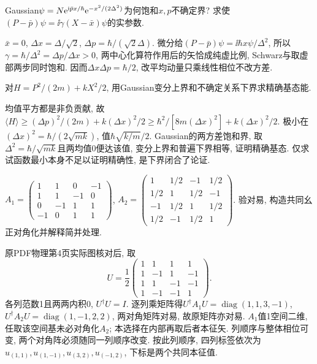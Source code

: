 \begin{exercise}
Gaussian$\psi=N\mathrm e^{\mathrm i\bar p x/\hbar}\mathrm e^{-x^2/(2\Delta^2)}$为何饱和$x,p$不确定界? 求使$(P-\bar p)\psi=\ii\gamma(X-\bar x)\psi$的实参数.
\end{exercise}
\begin{solution}
$\bar x=0$, $\Delta x=\Delta/\sqrt2$, $\Delta p=\hbar/(\sqrt2\Delta)$. 微分给$(P-\bar p)\psi=\ii\hbar x\psi/\Delta^2$, 所以$\gamma=\hbar/\Delta^2=\Delta p/\Delta x>0$, 两中心化算符作用后的矢恰成纯虚比例, Schwarz与取虚部两步同时饱和. 因而$\Delta x\Delta p=\hbar/2$, 改平均动量只乘线性相位不改方差.
\end{solution}
\begin{exercise}
对$H=P^2/(2m)+kX^2/2$, 用Gaussian变分上界和不确定关系下界求精确基态能.
\end{exercise}
\begin{solution}
均值平方都是非负贡献, 故$\langle H\rangle\ge(\Delta p)^2/(2m)+k(\Delta x)^2/2\ge\hbar^2/[8m(\Delta x)^2]+k(\Delta x)^2/2$. 极小在$(\Delta x)^2=\hbar/(2\sqrt{mk})$, 值$\hbar\sqrt{k/m}/2$. Gaussian的两方差饱和界, 取$\Delta^2=\hbar/\sqrt{mk}$且两均值0便达该值, 变分上界和普遍下界相等, 证明精确基态. 仅求试函数最小本身不足以证明精确性, 是下界闭合了论证.
\end{solution}
\begin{exercise}
$A_1=\begin{pmatrix}1&1&0&-1\\1&1&-1&0\\0&-1&1&1\\-1&0&1&1\end{pmatrix}$,
$A_2=\begin{pmatrix}1&1/2&-1&1/2\\1/2&1&1/2&-1\\-1&1/2&1&1/2\\1/2&-1&1/2&1\end{pmatrix}$. 验对易, 构造共同幺正对角化并解释简并处理.
\end{exercise}
\begin{solution}
原PDF物理第4页实际图核对后, 取
\[
U=\frac12\begin{pmatrix}1&1&1&1\\1&-1&1&-1\\1&1&-1&-1\\1&-1&-1&1\end{pmatrix}.
\]
各列范数1且两两内积0, $U^\dagger U=I$. 逐列乘矩阵得$U^\dagger A_1U=\operatorname{diag}(1,1,3,-1)$, $U^\dagger A_2U=\operatorname{diag}(1,-1,2,2)$, 两对角矩阵对易, 故原矩阵亦对易. $A_1$值1空间二维, 任取该空间基未必对角化$A_2$; 本选择在内部再取后者本征矢. 列顺序与整体相位可变, 两个对角阵必须随同一列顺序改变. 按此列顺序, 四列标签依次为$u_{(1,1)},u_{(1,-1)},u_{(3,2)},u_{(-1,2)}$, 下标是两个共同本征值.
\end{solution}
